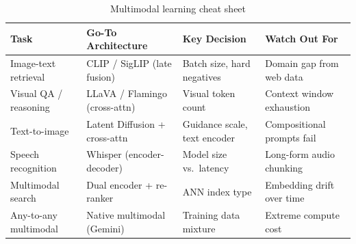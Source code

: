 \begin{table}[H]
\centering
\caption{Multimodal learning cheat sheet}
\begin{tabularx}{\textwidth}{lXXl}
\toprule
\textbf{Task} & \textbf{Go-To Architecture} & \textbf{Key Decision} & \textbf{Watch Out For} \\
\midrule
Image-text retrieval & CLIP / SigLIP (late fusion) & Batch size, hard negatives & Domain gap from web data \\
Visual QA / reasoning & LLaVA / Flamingo (cross-attn) & Visual token count & Context window exhaustion \\
Text-to-image & Latent Diffusion + cross-attn & Guidance scale, text encoder & Compositional prompts fail \\
Speech recognition & Whisper (encoder-decoder) & Model size vs.\ latency & Long-form audio chunking \\
Multimodal search & Dual encoder + re-ranker & ANN index type & Embedding drift over time \\
Any-to-any multimodal & Native multimodal (Gemini) & Training data mixture & Extreme compute cost \\
\bottomrule
\end{tabularx}
\end{table}
